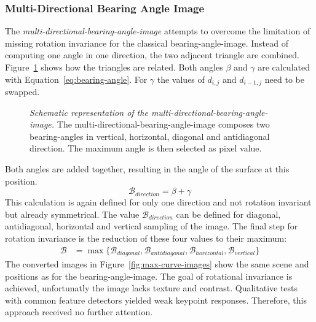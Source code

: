 \subsubsection{Multi-Directional Bearing Angle Image}

The \emph{\gls{multi-directional-bearing-angle-image}} attempts to overcome the limitation of missing rotation invariance for the classical \gls{bearing-angle-image}.
Instead of computing one angle in one direction, the two adjacent triangle are combined.
Figure~\ref{fig:max-curve} shows how the triangles are related.
Both angles $\beta$ and $\gamma$ are calculated with Equation~\ref{eq:bearing-angle}.
For $\gamma$ the values of $d_{i,j}$ and $d_{i-1,j}$ need to be swapped.
\begin{figure}
    \scalebox{0.9}{%
    
    }
    \caption[Schematic representation of the \gls{multi-directional-bearing-angle-image}]{\emph{Schematic representation of the \gls{multi-directional-bearing-angle-image}.} The \gls{multi-directional-bearing-angle-image} composes two \Glspl{bearing-angle} in vertical, horizontal, diagonal and antidiagonal direction. The maximum angle is then selected as pixel value.}\label{fig:max-curve}
\end{figure}
Both angles are added together, resulting in the angle of the surface at this position.
\begin{equation}
    \mathcal{B_{\textit{direction}}}= \beta + \gamma
\end{equation}
This calculation is again defined for only one direction and not rotation invariant but already symmetrical.
The value $\mathcal{B_{\textit{direction}}}$ can be defined for diagonal, antidiagonal, horizontal and vertical sampling of the image.
The final step for rotation invariance is the reduction of these four values to their maximum:
\vspace{-2mm}
\begin{align}
    \mathcal{B} &= \max{\{\mathcal{B}_{diagonal}, \mathcal{B}_{antidiagonal}, \mathcal{B}_{horizontal}, \mathcal{B}_{vertical}\}}
\end{align}
The converted images in Figure~\ref{fig:max-curve-images} show the same scene and positions as for the \gls{bearing-angle-image}.
The goal of rotational invariance is achieved, unfortunatly the image lacks texture and contrast.
Qualitative tests with common feature detectors yielded weak keypoint responses.
Therefore, this approach received no further attention.
